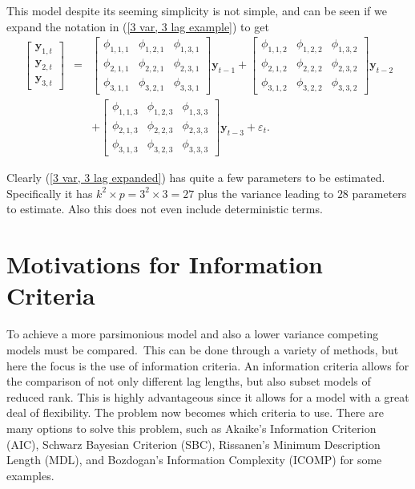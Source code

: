 This model despite its seeming simplicity is not simple, and can be
seen if we expand the notation in (\ref{3 var, 3 lag example}) to
get
\begin{eqnarray}
\left[\begin{array}{c}
\mathbf{y}_{1,t}\\
\mathbf{y}_{2,t}\\
\mathbf{y}_{3,t}
\end{array}\right] & = & \left[\begin{array}{ccc}
\phi_{1,1,1} & \phi_{1,2,1} & \phi_{1,3,1}\\
\phi_{2,1,1} & \phi_{2,2,1} & \phi_{2,3,1}\\
\phi_{3,1,1} & \phi_{3,2,1} & \phi_{3,3,1}
\end{array}\right]\mathbf{y}_{t-1}+\left[\begin{array}{ccc}
\phi_{1,1,2} & \phi_{1,2,2} & \phi_{1,3,2}\\
\phi_{2,1,2} & \phi_{2,2,2} & \phi_{2,3,2}\\
\phi_{3,1,2} & \phi_{3,2,2} & \phi_{3,3,2}
\end{array}\right]\mathbf{y}_{t-2}\nonumber \\
 &  & +\left[\begin{array}{ccc}
\phi_{1,1,3} & \phi_{1,2,3} & \phi_{1,3,3}\\
\phi_{2,1,3} & \phi_{2,2,3} & \phi_{2,3,3}\\
\phi_{3,1,3} & \phi_{3,2,3} & \phi_{3,3,3}
\end{array}\right]\mathbf{y}_{t-3}+\varepsilon_{t}.\label{3 var, 3 lag expanded}
\end{eqnarray}


Clearly (\ref{3 var, 3 lag expanded}) has quite a few parameters
to be estimated. Specifically it has $k^{2}\times p=3^{2}\times3=27$
plus the variance leading to $28$ parameters to estimate. Also this
does not even include deterministic terms.


\section{Motivations for Information Criteria}

To achieve a more parsimonious model and also a lower variance competing
models must be compared.\ This can be done through a variety of methods,
but here the focus is the use of information criteria. An information
criteria allows for the comparison of not only different lag lengths,
but also subset models of reduced rank. This is highly advantageous
since it allows for a model with a great deal of flexibility. The
problem now becomes which criteria to use. There are many options
to solve this problem, such as Akaike's Information Criterion (AIC),
Schwarz Bayesian Criterion (SBC), Rissanen's Minimum Description Length
(MDL), and Bozdogan's Information Complexity (ICOMP) for some examples.


